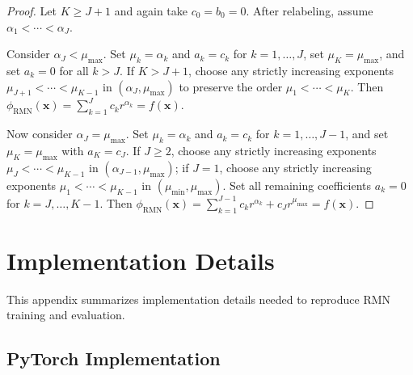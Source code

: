 \documentclass[twoside,11pt]{article}
\newcommand{\bx}{\bm{x}}
\begin{document}
\begin{proof}
	Let $K\ge J+1$ and again take $c_0=b_0=0$. After relabeling, assume $\alpha_1<\cdots<\alpha_J$.

	Consider $\alpha_J<\mu_{\max}$. Set $\mu_k=\alpha_k$ and $a_k=c_k$ for $k=1,\ldots,J$, set $\mu_K=\mu_{\max}$, and set $a_k=0$ for all $k>J$.
	If $K>J+1$, choose any strictly increasing exponents $\mu_{J+1}<\cdots<\mu_{K-1}$ in $(\alpha_J,\mu_{\max})$ to preserve the order $\mu_1<\cdots<\mu_K$.
	Then $\phi_{\text{RMN}}(\bx)=\sum_{k=1}^J c_k r^{\alpha_k}=f(\bx)$.

	Now consider $\alpha_J=\mu_{\max}$. Set $\mu_k=\alpha_k$ and $a_k=c_k$ for $k=1,\ldots,J-1$, and set $\mu_K=\mu_{\max}$ with $a_K=c_J$.
	If $J\ge2$, choose any strictly increasing exponents $\mu_J<\cdots<\mu_{K-1}$ in $(\alpha_{J-1},\mu_{\max})$; if $J=1$, choose any strictly increasing exponents $\mu_1<\cdots<\mu_{K-1}$ in $(\mu_{\min},\mu_{\max})$.
	Set all remaining coefficients $a_k=0$ for $k=J,\ldots,K-1$.
	Then $\phi_{\text{RMN}}(\bx)=\sum_{k=1}^{J-1} c_k r^{\alpha_k}+c_J r^{\mu_{\max}}=f(\bx)$.
\end{proof}

\section{Implementation Details}
\label{app:implementation}

This appendix summarizes implementation details needed to reproduce RMN training and evaluation.

\subsection{PyTorch Implementation}
\end{document}

